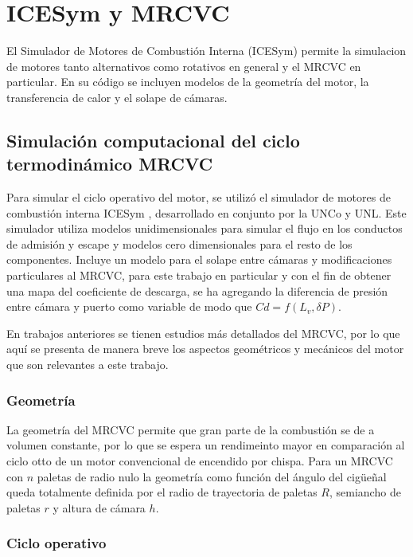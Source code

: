 \chapter{ICESym y MRCVC}

El Simulador de Motores de Combustión Interna (ICESym) permite la simulacion de
motores tanto alternativos como rotativos en general y el MRCVC en particular.
%
En su código se incluyen modelos de la geometría del motor, la transferencia
de calor y el solape de cámaras.

\section{Simulación computacional del ciclo termodinámico MRCVC}

Para simular el ciclo operativo del motor, se utilizó el simulador de motores
de combustión interna ICESym \cite{icesym},
desarrollado en conjunto por la UNCo y UNL.
%
Este simulador utiliza modelos unidimensionales para simular el flujo en los
conductos de admisión y escape y modelos cero dimensionales para el resto de
los componentes.
%
Incluye un modelo para el solape entre cámaras \cite{lopez16} y modificaciones
particulares al MRCVC, para este trabajo en particular  y con el fin de obtener
una mapa del coeficiente de descarga, se ha agregando la diferencia de presión
entre cámara y puerto como variable de modo que $Cd = f(L_v, \delta P)$.

En trabajos anteriores se tienen estudios más detallados del MRCVC, por lo que
aquí se presenta de manera breve los aspectos geométricos y mecánicos del motor
que son relevantes a este trabajo.

\subsection{Geometría}
%
La geometría del MRCVC permite que gran parte de la combustión se de a volumen
constante\cite{mrcvc_geom}, por lo que se espera un rendimeinto mayor en
comparación al ciclo otto de un motor convencional de encendido por chispa.
%
Para un MRCVC con $n$ paletas de radio nulo la geometría como función del
ángulo del cigüeñal queda totalmente definida por el radio de trayectoria de
paletas $R$, semiancho de paletas $r$ y altura de cámara $h$.

\subsection{Ciclo operativo}

